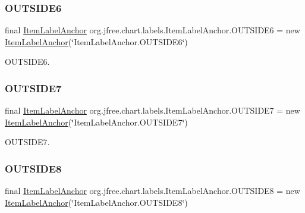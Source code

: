 \subsubsection{\texorpdfstring{O\+U\+T\+S\+I\+D\+E6}{OUTSIDE6}}
{\footnotesize\ttfamily final \mbox{\hyperlink{classorg_1_1jfree_1_1chart_1_1labels_1_1_item_label_anchor}{Item\+Label\+Anchor}} org.\+jfree.\+chart.\+labels.\+Item\+Label\+Anchor.\+O\+U\+T\+S\+I\+D\+E6 = new \mbox{\hyperlink{classorg_1_1jfree_1_1chart_1_1labels_1_1_item_label_anchor}{Item\+Label\+Anchor}}(\char`\"{}Item\+Label\+Anchor.\+O\+U\+T\+S\+I\+D\+E6\char`\"{})\hspace{0.3cm}{\ttfamily [static]}}

O\+U\+T\+S\+I\+D\+E6. \mbox{\label{classorg_1_1jfree_1_1chart_1_1labels_1_1_item_label_anchor_ab36bb64e3662a1e29c402820d9e7efeb}} 
\subsubsection{\texorpdfstring{O\+U\+T\+S\+I\+D\+E7}{OUTSIDE7}}
{\footnotesize\ttfamily final \mbox{\hyperlink{classorg_1_1jfree_1_1chart_1_1labels_1_1_item_label_anchor}{Item\+Label\+Anchor}} org.\+jfree.\+chart.\+labels.\+Item\+Label\+Anchor.\+O\+U\+T\+S\+I\+D\+E7 = new \mbox{\hyperlink{classorg_1_1jfree_1_1chart_1_1labels_1_1_item_label_anchor}{Item\+Label\+Anchor}}(\char`\"{}Item\+Label\+Anchor.\+O\+U\+T\+S\+I\+D\+E7\char`\"{})\hspace{0.3cm}{\ttfamily [static]}}

O\+U\+T\+S\+I\+D\+E7. \mbox{\label{classorg_1_1jfree_1_1chart_1_1labels_1_1_item_label_anchor_a857de591a6f09c83918bd8980151e7a2}} 
\subsubsection{\texorpdfstring{O\+U\+T\+S\+I\+D\+E8}{OUTSIDE8}}
{\footnotesize\ttfamily final \mbox{\hyperlink{classorg_1_1jfree_1_1chart_1_1labels_1_1_item_label_anchor}{Item\+Label\+Anchor}} org.\+jfree.\+chart.\+labels.\+Item\+Label\+Anchor.\+O\+U\+T\+S\+I\+D\+E8 = new \mbox{\hyperlink{classorg_1_1jfree_1_1chart_1_1labels_1_1_item_label_anchor}{Item\+Label\+Anchor}}(\char`\"{}Item\+Label\+Anchor.\+O\+U\+T\+S\+I\+D\+E8\char`\"{})\hspace{0.3cm}{\ttfamily [static]}}

